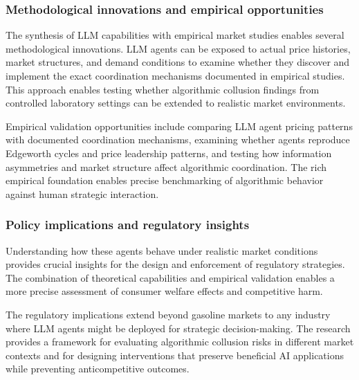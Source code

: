 \subsubsection*{Methodological innovations and empirical opportunities}

The synthesis of LLM capabilities with empirical market studies enables several methodological innovations. LLM agents can be exposed to actual price histories, market structures, and demand conditions to examine whether they discover and implement the exact coordination mechanisms documented in empirical studies. This approach enables testing whether algorithmic collusion findings from controlled laboratory settings can be extended to realistic market environments.

Empirical validation opportunities include comparing LLM agent pricing patterns with documented coordination mechanisms, examining whether agents reproduce Edgeworth cycles and price leadership patterns, and testing how information asymmetries and market structure affect algorithmic coordination. The rich empirical foundation enables precise benchmarking of algorithmic behavior against human strategic interaction.

\subsubsection*{Policy implications and regulatory insights}

Understanding how these agents behave under realistic market conditions provides crucial insights for the design and enforcement of regulatory strategies. The combination of theoretical capabilities and empirical validation enables a more precise assessment of consumer welfare effects and competitive harm.

The regulatory implications extend beyond gasoline markets to any industry where LLM agents might be deployed for strategic decision-making. The research provides a framework for evaluating algorithmic collusion risks in different market contexts and for designing interventions that preserve beneficial AI applications while preventing anticompetitive outcomes.